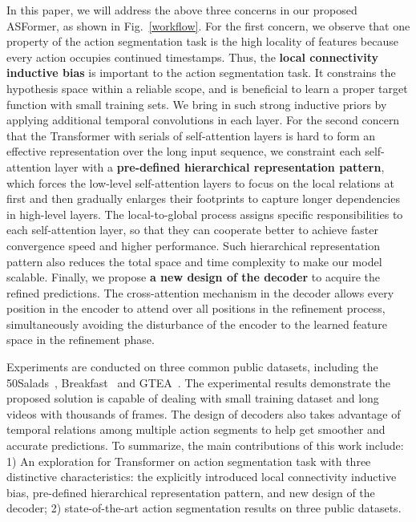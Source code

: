 \documentclass{bmvc2k}
\begin{document}
In this paper, we will address the above three concerns in our proposed ASFormer, as shown in Fig.~\ref{workflow}. For the first concern, we observe that one property of the action segmentation task is the high locality of features because every action occupies continued timestamps. Thus, the \textbf{ local connectivity inductive bias} is important to the action segmentation task. It constrains the hypothesis space within a reliable scope, and is beneficial to learn a proper target function with small training sets. We bring in such strong inductive priors by applying additional temporal convolutions in each layer. For the second concern that the Transformer with serials of self-attention layers is hard to form an effective representation over the long input sequence, we constraint each self-attention layer with a \textbf{pre-defined hierarchical representation pattern}, which forces the low-level self-attention layers to focus on the local relations at first and then gradually enlarges their footprints to capture longer dependencies in high-level layers. The local-to-global process assigns specific responsibilities to each self-attention layer, so that they can cooperate better to achieve faster convergence speed and higher performance. Such hierarchical representation pattern also reduces the total space and time complexity to make our model scalable. Finally, we propose \textbf{a new design of the decoder} to acquire the refined predictions. The cross-attention mechanism in the decoder allows every position in the encoder to attend over all positions in the refinement process, simultaneously avoiding the disturbance of the encoder to the learned feature space in the refinement phase.

Experiments are conducted on three common public datasets, including the 50Salads~\cite{50salads}, Breakfast~\cite{breakfast} and GTEA~\cite{gtea}. The experimental results demonstrate the proposed solution is capable of dealing with small training dataset and long videos with thousands of frames. The design of decoders also takes advantage of temporal relations among multiple action segments to help get smoother and accurate predictions. To summarize, the main contributions of this work include: 1) An exploration for Transformer on action segmentation task with three distinctive characteristics: the explicitly introduced local connectivity inductive bias, pre-defined hierarchical representation pattern, and new design of the decoder; 2) state-of-the-art action segmentation results on three public datasets. 
\end{document}

